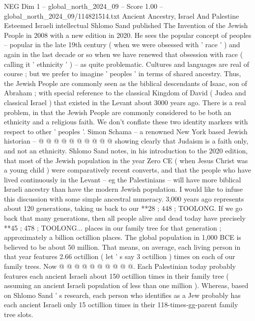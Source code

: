 \begin{textsample}{NEG Dim 1 – global\_north\_2024\_09 – Score 1.00 – global\_north\_2024\_09/114821514.txt}  \label{ex:f1_neg_363}
Ancient Ancestry, Israel And Palestine Esteemed Israeli intellectual Shlomo Sand published The Invention of the Jewish People in 2008 with a new edition in 2020.
He sees the popular concept of peoples -- popular in the late 19th century ( when we were obsessed with ' race ' ) and again in the last decade or so when we have renewed that obsession with race ( calling it ' ethnicity ' ) -- as quite problematic.
Cultures and languages are real of course ; but we prefer to imagine ' peoples ' in terms of shared ancestry.
Thus, the Jewish People are commonly seen as the biblical descendants of Isaac, son of Abraham ; with special reference to the classical Kingdom of David ( Judea and classical Israel ) that existed in the Levant about 3000 years ago.
There is a real problem, in that the Jewish People are commonly considered to be both an ethnicity and a religious faith.
We don't conflate these two identity markers with respect to other ' peoples '.
Simon Schama -- a renowned New York based Jewish historian -- @ @ @ @ @ @ @ @ @ @ showing clearly that Judaism is a faith only, and not an ethnicity.
Shlomo Sand notes, in his introduction to the 2020 edition, that most of the Jewish population in the year Zero CE ( when Jesus Christ was a young child ) were comparatively recent converts, and that the people who have lived continuously in the Levant -- eg the Palestinians -- will have more biblical Israeli ancestry than have the modern Jewish population.
I would like to infuse this discussion with some simple ancestral numeracy. 3,000 years ago represents about 120 generations, taking us back to our **28 ; 448 ; TOOLONG.
If we go back that many generations, then all people alive and dead today have precisely **45 ; 478 ; TOOLONG... places in our family tree for that generation ; approximately a billion octillion places.
The global population in 1,000 BCE is believed to be about 50 million.
That means, on average, each living person in that year features 2.66 octillion ( let ' s say 3 octillion ) times on each of our family trees.
Now @ @ @ @ @ @ @ @ @ @.
Each Palestinian today probably features each ancient Israeli about 150 octillion times in their family tree ( assuming an ancient Israeli population of less than one million ).
Whereas, based on Shlomo Sand ' s research, each person who identifies as a Jew probably has each ancient Israeli only 15 octillion times in their 118-times-gg-parent family tree slots.

\end{textsample}
